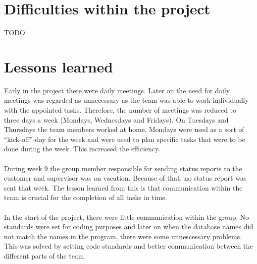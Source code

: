 \section{Difficulties within the project}

TODO

\section{Lessons learned}

Early in the project there were daily meetings. Later on the need for daily meetings was regarded as unnecessary as the team was able to work individually with the appointed tasks. Therefore, the number of meetings was reduced to three days a week (Mondays, Wednesdays and Fridays). On Tuesdays and Thursdays the team members worked at home. Mondays were used as a sort of “kick-off”-day for the week and were used to plan specific tasks that were to be done during the week. This increased the efficiency.\\
\\
During week 9 the group member responsible for sending status reports to the customer and supervisor was on vacation. Because of that, no status report was sent that week. The lesson learned from this is that communication within the team is crucial for the completion of all tasks in time.\\
\\
In the start of the project, there were little communication within the group. No standards were set
for coding purposes and later on when the database names did not match the names in the program, there were some unnescessary
problems. This was solved by setting code standards and better communication between the different 
parts of the team. 
